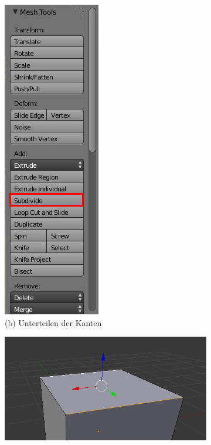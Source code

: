 \documentclass[10pt,a5paper,twoside,titlepage]{scrartcl}
\begin{document}
	\begin{figure}
	\begin{minipage}[h]{.5\textwidth}
		\begin{subfigure}[a]{\textwidth}
			\centering
    			\includegraphics[width=.5\textwidth]{blender_house_subdiv.png}
    			\caption{(b) Unterteilen der Kanten}
    		\end{subfigure}
    \end{minipage}
    \begin{minipage}[h]{.5\textwidth}
		\begin{subfigure}{\textwidth}
			\centering
    			\includegraphics[width=\textwidth]{Blender_house_select.png}

\end{subfigure}
\end{minipage}
\end{figure}
\end{document}
